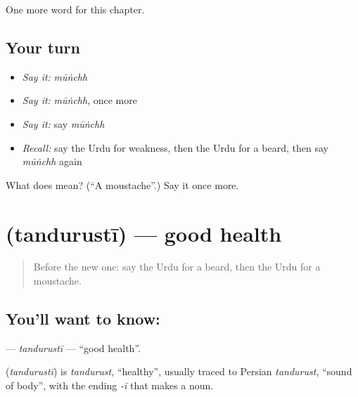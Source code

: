 \begin{grammarlens}[title={What you've built}]
One more word for this chapter.
\end{grammarlens}

\subsection*{Your turn}
\begin{itemize}
\raggedright
  \item \emph{Say it:} \emph{mūṅchh}
  \item \emph{Say it:} \emph{mūṅchh}, once more
  \item \emph{Say it:} say \emph{mūṅchh}
  \item \emph{Recall:} say the Urdu for weakness, then the Urdu for a beard, then say \emph{mūṅchh} again
\end{itemize}

\begin{tcolorbox}[breakable,colback=teal!4,colframe=teal!35!black,title={Before you move on}]
What does  mean? (\textquotedblleft{}A moustache\textquotedblright{}.) Say it once more.
\end{tcolorbox}
\section[\texorpdfstring{\ur{تندرستی} (tandurustī)}{تندرستی (tandurustī)}]{ (tandurustī) — good health}

\label{lesson:UR-C217-tandurusti}



\begin{quote}
Before the new one: say the Urdu for a beard, then the Urdu for a moustache.
\end{quote}

\subsection*{You'll want to know: }
\textbf{} — \emph{tandurustī} — \textquotedblleft{}good health\textquotedblright{}.

\begin{cousinweb}
\textbf{} (\emph{tandurustī}) is \emph{tandurust}, \textquotedblleft{}healthy\textquotedblright{}, usually traced to Persian \emph{tandurust}, \textquotedblleft{}sound of body\textquotedblright{}, with the ending \emph{-ī} that makes a noun.
\end{cousinweb}

